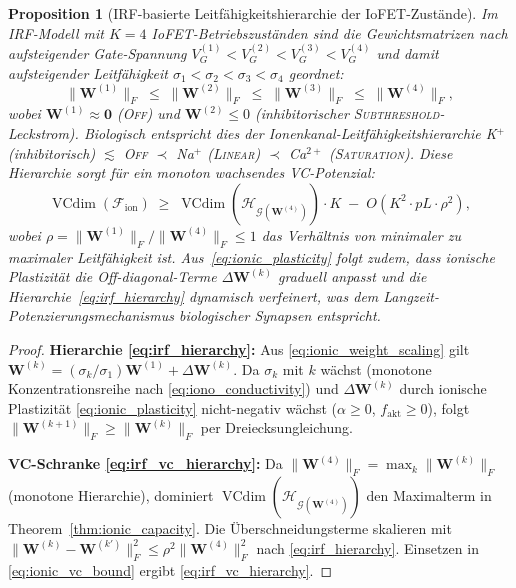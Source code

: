 \documentclass[12pt, a4paper, openany]{report}
\newtheorem{proposition}[theorem]{Proposition}
\newcommand{\calG}{\mathcal{G}}
\newcommand{\calH}{\mathcal{H}}
\newcommand{\calF}{\mathcal{F}}
\DeclareMathOperator{\VC}{VCdim}
\begin{document}
\begin{proposition}[IRF-basierte Leitfähigkeitshierarchie der IoFET-Zustände]
\label{prop:ionic_hierarchy}
Im IRF-Modell mit $K=4$ IoFET-Betriebszuständen sind die Gewichtsmatrizen
nach aufsteigender Gate-Spannung $V_G^{(1)} < V_G^{(2)} < V_G^{(3)} < V_G^{(4)}$
und damit aufsteigender Leitfähigkeit $\sigma_1 < \sigma_2 < \sigma_3 < \sigma_4$
geordnet:
\begin{equation}
  \label{eq:irf_hierarchy}
  \|\bm{W}^{(1)}\|_F \;\leq\; \|\bm{W}^{(2)}\|_F \;\leq\;
  \|\bm{W}^{(3)}\|_F \;\leq\; \|\bm{W}^{(4)}\|_F,
\end{equation}
wobei $\bm{W}^{(1)} \approx \bm{0}$ (\textsc{Off}) und $\bm{W}^{(2)} \leq 0$
(inhibitorischer \textsc{Subthreshold}-Leckstrom).  Biologisch entspricht
dies der Ionenkanal-Leitfähigkeitshierarchie
K$^+$ (inhibitorisch) $\lesssim$ \textsc{Off} $\prec$ Na$^+$ (\textsc{Linear})
$\prec$ Ca$^{2+}$ (\textsc{Saturation}).
Diese Hierarchie sorgt für ein monoton wachsendes VC-Potenzial:
\begin{equation}
  \label{eq:irf_vc_hierarchy}
  \VC(\calF_{\mathrm{ion}}) \;\geq\; \VC(\calH_{\calG(\bm{W}^{(4)})}) \cdot K
  \;-\; O(K^2 \cdot p L \cdot \rho^2),
\end{equation}
wobei $\rho = \|\bm{W}^{(1)}\|_F / \|\bm{W}^{(4)}\|_F \leq 1$ das
Verhältnis von minimaler zu maximaler Leitfähigkeit ist.
Aus~\eqref{eq:ionic_plasticity} folgt zudem, dass ionische Plastizität
die Off-diagonal-Terme $\Delta\bm{W}^{(k)}$ graduell anpasst und die
Hierarchie~\eqref{eq:irf_hierarchy} dynamisch verfeinert, was dem
Langzeit-Potenzierungsmechanismus biologischer Synapsen entspricht.
\end{proposition}

\begin{proof}
\textbf{Hierarchie \eqref{eq:irf_hierarchy}:}
Aus \eqref{eq:ionic_weight_scaling} gilt $\bm{W}^{(k)} = (\sigma_k/\sigma_1)
\bm{W}^{(1)} + \Delta\bm{W}^{(k)}$.  Da $\sigma_k$ mit $k$ wächst
(monotone Konzentrationsreihe nach \eqref{eq:iono_conductivity}) und
$\Delta\bm{W}^{(k)}$ durch ionische Plastizität \eqref{eq:ionic_plasticity}
nicht-negativ wächst ($\alpha \geq 0$, $f_\mathrm{akt} \geq 0$), folgt
$\|\bm{W}^{(k+1)}\|_F \geq \|\bm{W}^{(k)}\|_F$ per Dreiecksungleichung.

\textbf{VC-Schranke \eqref{eq:irf_vc_hierarchy}:}
Da $\|\bm{W}^{(4)}\|_F = \max_k \|\bm{W}^{(k)}\|_F$ (monotone Hierarchie),
dominiert $\VC(\calH_{\calG(\bm{W}^{(4)})})$ den Maximalterm in
Theorem~\ref{thm:ionic_capacity}.  Die Überschneidungsterme skalieren
mit $\|\bm{W}^{(k)} - \bm{W}^{(k')}\|_F^2 \leq \rho^2 \|\bm{W}^{(4)}\|_F^2$
nach \eqref{eq:irf_hierarchy}.  Einsetzen in
\eqref{eq:ionic_vc_bound} ergibt \eqref{eq:irf_vc_hierarchy}.
\end{proof}
\end{document}
